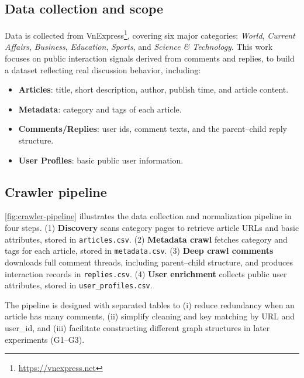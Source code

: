 \documentclass[11pt]{article}
\begin{document}
\subsection{Data collection and scope}
Data is collected from VnExpress\footnote{\url{https://vnexpress.net}}, covering six major categories: \textit{World}, \textit{Current Affairs}, \textit{Business}, \textit{Education}, \textit{Sports}, and \textit{Science \& Technology}.
This work focuses on public interaction signals derived from comments and replies, to build a dataset reflecting real discussion behavior, including:
\begin{itemize}
    \item \textbf{Articles}: title, short description, author, publish time, and article content.
    \item \textbf{Metadata}: category and tags of each article.
    \item \textbf{Comments/Replies}: user ids, comment texts, and the parent--child reply structure.
    \item \textbf{User Profiles}: basic public user information.
\end{itemize}

\subsection{Crawler pipeline}
\autoref{fig:crawler-pipeline} illustrates the data collection and normalization pipeline in four steps.
(1) \textbf{Discovery} scans category pages to retrieve article URLs and basic attributes, stored in \texttt{articles.csv}.
(2) \textbf{Metadata crawl} fetches category and tags for each article, stored in \texttt{metadata.csv}.
(3) \textbf{Deep crawl comments} downloads full comment threads, including parent--child structure, and produces interaction records in \texttt{replies.csv}.
(4) \textbf{User enrichment} collects public user attributes, stored in \texttt{user\_profiles.csv}.

The pipeline is designed with separated tables to (i) reduce redundancy when an article has many comments,
(ii) simplify cleaning and key matching by URL and user\_id,
and (iii) facilitate constructing different graph structures
in later experiments (G1--G3).
\end{document}
